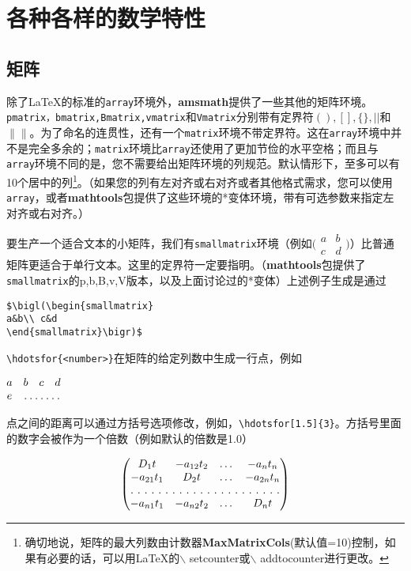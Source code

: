 \documentclass[openany]{ctexbook}
\begin{document}
\chapter{各种各样的数学特性}
\section{矩阵}
除了\LaTeX 的标准的\verb|array|环境外，{\bfseries amsmath}提供了一些其他的矩阵环境。\verb|pmatrix，bmatrix,Bmatrix,vmatrix|和\verb|Vmatrix|分别带有定界符$(),[],\{\},||$和$\|\|$。为了命名的连贯性，还有一个\verb|matrix|环境不带定界符。这在\verb|array|环境中并不是完全多余的；\verb|matrix|环境比\verb|array|还使用了更加节俭的水平空格；而且与\verb|array|环境不同的是，您不需要给出矩阵环境的列规范。默认情形下，至多可以有10个居中的列\footnote{确切地说，矩阵的最大列数由计数器{\bfseries MaxMatrixCols}(默认值=10)控制，如果有必要的话，可以用\LaTeX 的{$\backslash$
setcounter}或{$\backslash$ addtocounter}进行更改。}。（如果您的列有左对齐或右对齐或者其他格式需求，您可以使用\verb|array|，或者{\bfseries mathtools}包提供了这些环境的*变体环境，带有可选参数来指定左对齐或右对齐。）

要生产一个适合文本的小矩阵，我们有\verb|smallmatrix|环境（例如$\bigl(\begin{smallmatrix}
a&b\\ c&d
\end{smallmatrix}\bigr)$）比普通矩阵更适合于单行文本。这里的定界符一定要指明。（{\bfseries mathtools}包提供了\verb|smallmatrix|的p,b,B,v,V版本，以及上面讨论过的*变体）上述例子生成是通过
\begin{verbatim}
$\bigl(\begin{smallmatrix}
a&b\\ c&d
\end{smallmatrix}\bigr)$
\end{verbatim}

\verb|\hdotsfor{<number>}|在矩阵的给定列数中生成一行点，例如
\begin{listing}
  $\begin{matrix}
a&b&c&d\\
e&\hdotsfor{3}
 \end{matrix}$
\end{listing}

点之间的距离可以通过方括号选项修改，例如，\verb|\hdotsfor[1.5]{3}|。方括号里面的数字会被作为一个倍数（例如默认的倍数是1.0）
\begin{tcblisting}{}
\begin{equation}
\begin{pmatrix}
D_1t&-a_{12}t_2&\dots&-a_{n}t_n\\
-a_{21}t_1&D_2t&\dots&-a_{2n}t_n\\
\hdotsfor[2]{4}\\
-a_{n1}t_1&-a_{n2}t_2&\dots&D_nt
\end{pmatrix}
\end{equation}
\end{tcblisting}
\end{document}
